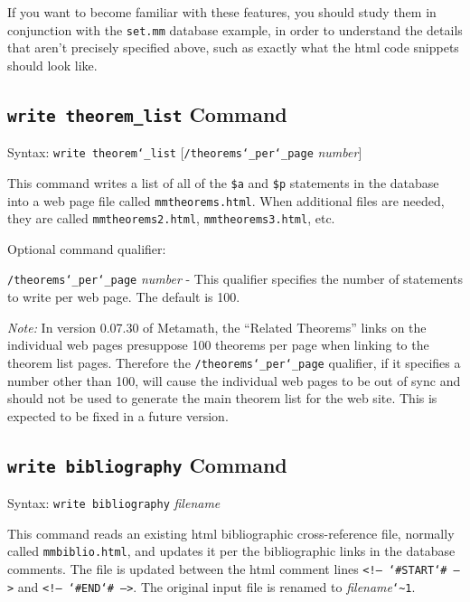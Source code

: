If you want to become familiar with these features, you should study
them in conjunction with the
\texttt{set.mm}
database example, in order
to understand the details that aren't precisely specified above, such as
exactly what the {\sc html} code snippets should look like.



\subsection{\texttt{write theorem\_list}
Command}
Syntax:  \texttt{write theorem{\char`\_}list}
[\texttt{/theorems{\char`\_}per{\char`\_}page} {\em number}]

This command writes a list of all of the \texttt{\$a} and \texttt{\$p}
statements in the database into a web page file
 called \texttt{mmtheorems.html}.
When additional files are needed, they are called
\texttt{mmtheorems2.html}, \texttt{mmtheorems3.html}, etc.

Optional command qualifier:

    \texttt{/theorems{\char`\_}per{\char`\_}page} {\em number} -
 This qualifier specifies the number of statements to
        write per web page.  The default is 100.

{\em Note:} In version 0.07.30 of Metamath, the ``Related Theorems'' links on the individual
web pages presuppose 100 theorems per page when linking to the theorem
list pages.  Therefore the \texttt{/theorems{\char`\_}per{\char`\_}page}
qualifier, if it specifies a number other than 100, will cause the
individual web pages to be out of sync and should not be used to
generate the main theorem list for the web site.  This is expected to be
fixed in a future version.


\subsection{\texttt{write bibliography}\label{wrbib}
Command}
Syntax:  \texttt{write bibliography} {\em filename}

This command reads an existing {\sc html} bibliographic cross-reference
file, normally called \texttt{mmbiblio.html}, and updates it per the
bibliographic links in the database comments.  The file is updated
between the {\sc html} comment lines \texttt{<!--
{\char`\#}START{\char`\#} -->} and \texttt{<!-- {\char`\#}END{\char`\#}
-->}.  The original input file is renamed to {\em
filename}\texttt{{\char`\~}1}.

